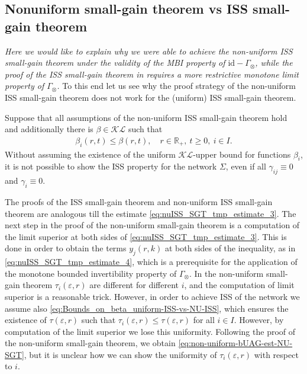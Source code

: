 \documentclass[twocolumn]{IEEEtran} %
\theoremstyle{definition}
\newtheorem{remark}[theorem]{Remark}
\newcommand{\R}{\mathbb{R}}%
\newcommand{\KL}{\mathcal{KL}}%
\newcommand{\ep}{\varepsilon}%
\newcommand{\id}{\mathrm{id}}%
\begin{document}
%


\subsection{Nonuniform small-gain theorem vs ISS small-gain theorem}

\emph{Here we would like to explain why we were able to achieve the non-uniform ISS small-gain theorem under the validity of the MBI property of $\id-\Gamma_\otimes$, while the proof of the ISS small-gain theorem in \cite{MKG20} requires a more restrictive monotone limit property of $\Gamma_\otimes$.}
To this end let us see why the proof strategy of the non-uniform ISS small-gain theorem does not work for the (uniform) ISS small-gain theorem.

Suppose that all assumptions of the non-uniform ISS small-gain theorem hold and additionally there is $\beta\in\KL$ such that
\begin{eqnarray}
\beta_i(r,t)\leq \beta(r,t),\quad r\in\R_+,\ t\geq 0,\ i\in I.
\label{eq:Bounds_on_beta_uniform-ISS-vs-NU-ISS}
\end{eqnarray}
Without assuming the existence of the uniform $\KL$-upper bound for functions $\beta_i$, it is not possible to show the ISS property for the network $\Sigma$, even if all $\gamma_{ij}\equiv 0$ and $\gamma_i\equiv 0$.


The proofs of the ISS small-gain theorem and non-uniform ISS small-gain theorem are analogous till the estimate \eqref{eq:nuISS_SGT_tmp_estimate_3}.
The next step in the proof of the non-uniform small-gain theorem is a computation of the limit superior at both sides of \eqref{eq:nuISS_SGT_tmp_estimate_3}.
This is done in order to obtain the terms $y_j(r,k)$ at both sides of the inequality, as in \eqref{eq:nuISS_SGT_tmp_estimate_4}, which is a prerequisite for the application of the monotone bounded invertibility property of $\Gamma_{\otimes}$.
In the non-uniform small-gain theorem $\tau_i(\varepsilon,r)$ are different for different $i$, and the computation of limit superior is a reasonable trick. 
However, in order to achieve ISS of the network we assume also \eqref{eq:Bounds_on_beta_uniform-ISS-vs-NU-ISS}, which ensures the existence of $\tau(\varepsilon,r)$ such that 
$\tau_i(\varepsilon,r)\leq\tau(\varepsilon,r)$ for all $i\in I$.
However, by computation of the limit superior we lose this uniformity. Following the proof of the non-uniform small-gain theorem, we obtain \eqref{eq:non-uniform-bUAG-est-NU-SGT}, but it is unclear how we can show the uniformity of $\tau_i(\ep,r)$ with respect to $i$.
\end{document}
